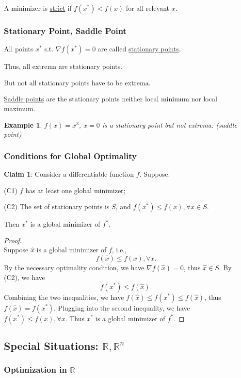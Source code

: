 \documentclass[11pt,a4paper]{article}
\newtheorem{example}{Example}
\begin{document}
A minimizer is \underline{strict} if $f(x^*)< f(x)$ for all relevant $x$.

\subsubsection{Stationary Point, Saddle Point}
All points $x^*$ s.t. $\nabla f(x^*)=0$ are called \underline{stationary points}.

Thus, all extrema are stationary points.

But not all stationary points have to be extrema.

\underline{Saddle points} are the stationary points neither local minimum nor local maximum.

\begin{example}
$f(x)=x^3$, $x=0$ is a stationary point but not extrema. (saddle point)
\end{example}

\subsubsection{Conditions for Global Optimality}
\textbf{Claim 1}: Consider a differentiable function $f$. Suppose:

(C1) $f$ has at least one global minimizer;

(C2) The set of stationary points is $S$, and $f\left(x^{*}\right) \leq f(x), \forall x \in S$.

Then $x^{*}$ is a global minimizer of $f^{*}$.
\begin{proof}
\quad\\
Suppose $\hat{x}$ is a global minimizer of $f$, i.e.,
$$
f(\hat{x}) \leq f(x), \forall x .
$$
By the necessary optimality condition, we have $\nabla f(\hat{x})=0$, thus $\hat{x} \in S$. By (C2), we have
$$
f\left(x^{*}\right) \leq f(\hat{x}) .
$$
Combining the two inequalities, we have $f(\hat{x}) \leq f\left(x^{*}\right) \leq f(\hat{x})$, thus $f(\hat{x})=f\left(x^{*}\right)$. Plugging into the second inequality, we have $f\left(x^{*}\right) \leq f(x), \forall x$. Thus $x^{*}$ is a global minimizer of $f^{*} .$
\end{proof}

\subsection{Special Situations: $\mathbb{R}, \mathbb{R}^n$}
\subsubsection{Optimization in $\mathbb{R}$}
\end{document}
